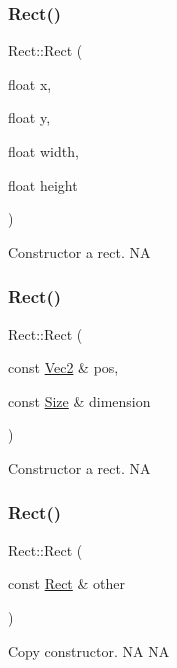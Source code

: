 \subsubsection{\texorpdfstring{Rect()}{Rect()}\hspace{0.1cm}{\footnotesize\ttfamily [2/8]}}
{\footnotesize\ttfamily Rect\+::\+Rect (\begin{DoxyParamCaption}\item[{float}]{x,  }\item[{float}]{y,  }\item[{float}]{width,  }\item[{float}]{height }\end{DoxyParamCaption})}

Constructor a rect.  NA \mbox{\label{classRect_a83b42c791d8ce7b8c08356755abe295c}} 
\subsubsection{\texorpdfstring{Rect()}{Rect()}\hspace{0.1cm}{\footnotesize\ttfamily [3/8]}}
{\footnotesize\ttfamily Rect\+::\+Rect (\begin{DoxyParamCaption}\item[{const \hyperlink{classVec2}{Vec2} \&}]{pos,  }\item[{const \hyperlink{classSize}{Size} \&}]{dimension }\end{DoxyParamCaption})}

Constructor a rect.  NA \mbox{\label{classRect_a82f6b6e265c6c9ef8c644e2d0660a2bb}} 
\subsubsection{\texorpdfstring{Rect()}{Rect()}\hspace{0.1cm}{\footnotesize\ttfamily [4/8]}}
{\footnotesize\ttfamily Rect\+::\+Rect (\begin{DoxyParamCaption}\item[{const \hyperlink{classRect}{Rect} \&}]{other }\end{DoxyParamCaption})}

Copy constructor.  NA  NA \mbox{\label{classRect_a911e531b86de33734dd7de3456722115}} 
